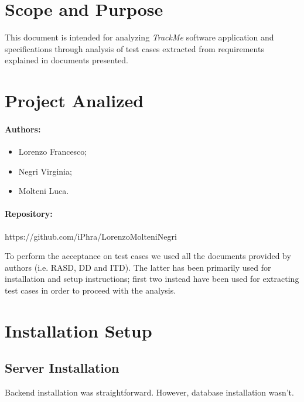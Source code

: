 \documentclass[a4paper]{article}
\begin{document}

\tableofcontents
{}

\newpage
\pagestyle{fancy}
\section{Scope and Purpose}
This document is intended for analyzing \textit{TrackMe} software application and specifications through analysis of test cases extracted from requirements explained in documents presented.

\section{Project Analized}
\paragraph{Authors:}
\begin{itemize}
    \item Lorenzo Francesco;
    \item Negri Virginia;
    \item Molteni Luca.
\end{itemize}
\paragraph{Repository:}
https://github.com/iPhra/LorenzoMolteniNegri \newline

To perform the acceptance on test cases we used all the documents provided by authors (i.e. RASD, DD and ITD). The latter has been primarily used for installation and setup instructions; first two instead have been used for extracting test cases in order to proceed with the analysis.

\newpage
\section{Installation Setup}
\subsection{Server Installation}
Backend installation was straightforward. However, database installation wasn't.\\
\end{document}
